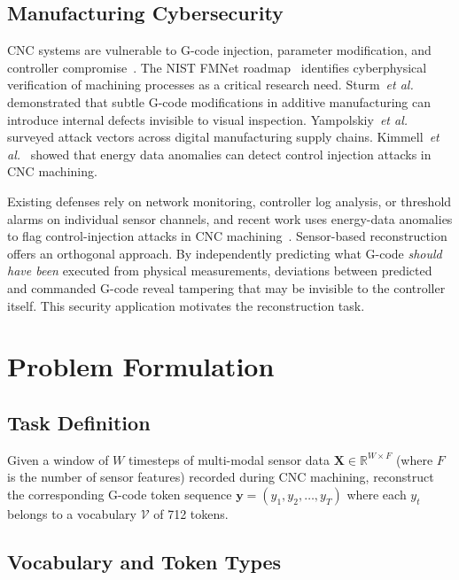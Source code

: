 \documentclass[sensors,article,submit,moreauthors,pdftex]{Definitions/mdpi}
\newcommand{\etal}{\textit{et al.}}
\begin{document}
\subsection{Manufacturing Cybersecurity}
\label{sec:related_security}

CNC systems are vulnerable to G-code injection, parameter modification, and controller compromise~\cite{zonouz2014plc,nist2023sp80082}. The NIST FMNet roadmap~\cite{nist2024fmnet} identifies cyberphysical verification of machining processes as a critical research need. Sturm~\etal~\cite{sturm2014cyber} demonstrated that subtle G-code modifications in additive manufacturing can introduce internal defects invisible to visual inspection. Yampolskiy~\etal~\cite{yampolskiy2018security} surveyed attack vectors across digital manufacturing supply chains. Kimmell~\etal~\cite{kimmell2025cnc} showed that energy data anomalies can detect control injection attacks in CNC machining.

Existing defenses rely on network monitoring, controller log analysis, or threshold alarms on individual sensor channels, and recent work uses energy-data anomalies to flag control-injection attacks in CNC machining~\cite{kimmell2025cnc}. Sensor-based reconstruction offers an orthogonal approach. By independently predicting what G-code \emph{should have been} executed from physical measurements, deviations between predicted and commanded G-code reveal tampering that may be invisible to the controller itself. This security application motivates the reconstruction task.

\section{Problem Formulation}
\label{sec:problem}

\subsection{Task Definition}

Given a window of $W$ timesteps of multi-modal sensor data $\mathbf{X} \in \mathbb{R}^{W \times F}$ (where $F$ is the number of sensor features) recorded during CNC machining, reconstruct the corresponding G-code token sequence $\mathbf{y} = (y_1, y_2, \ldots, y_T)$ where each $y_t$ belongs to a vocabulary $\mathcal{V}$ of 712 tokens.

\subsection{Vocabulary and Token Types}
\end{document}
